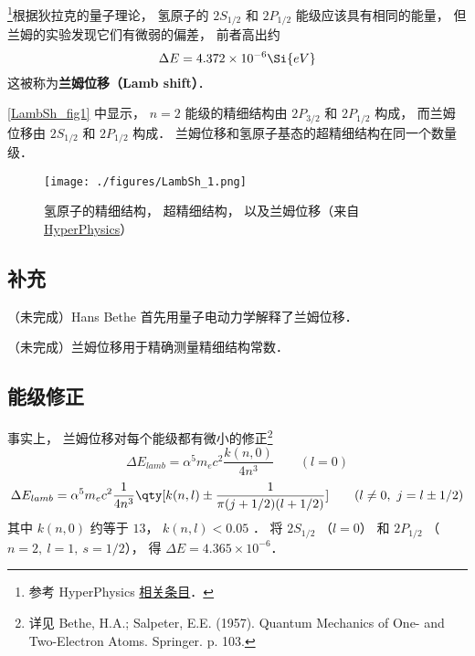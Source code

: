 

\footnote{参考 HyperPhysics \href{http://hyperphysics.phy-astr.gsu.edu/hbase/quantum/lamb.html}{相关条目}．}根据狄拉克的量子理论， 氢原子的 $2S_{1/2}$ 和 $2P_{1/2}$ 能级应该具有相同的能量， 但兰姆的实验发现它们有微弱的偏差， 前者高出约
\begin{equation}
\Delta E = 4.372\times 10^{-6} \Si{eV}
\end{equation}
这被称为\textbf{兰姆位移（Lamb shift）}．

\autoref{LambSh_fig1} 中显示， $n=2$ 能级的精细结构由 $2P_{3/2}$ 和 $2P_{1/2}$ 构成， 而兰姆位移由 $2S_{1/2}$ 和 $2P_{1/2}$ 构成． 兰姆位移和氢原子基态的超精细结构在同一个数量级． 
\begin{figure}[ht]
\centering
\texttt{[image: ./figures/LambSh\_1.png]}
\caption{氢原子的精细结构， 超精细结构， 以及兰姆位移（来自 \href{http://hyperphysics.phy-astr.gsu.edu/hbase/quantum/lamb.html}{HyperPhysics}）} \label{LambSh_fig1}
\end{figure} %

\subsection{补充}
（未完成）Hans Bethe 首先用量子电动力学解释了兰姆位移．

（未完成）兰姆位移用于精确测量精细结构常数．

\subsection{能级修正}
事实上， 兰姆位移对每个能级都有微小的修正\footnote{详见 Bethe, H.A.; Salpeter, E.E. (1957). Quantum Mechanics of One- and Two-Electron Atoms. Springer. p. 103.}
\begin{equation}
\Delta E_{lamb} = \alpha^5 m_e c^2 \frac{k(n, 0)}{4n^3} \qquad (l = 0)
\end{equation}
\begin{equation}
\Delta E_{lamb} =\alpha^5 m_e c^2 \frac{1}{4n^3} \qty[k(n,l) \pm \frac{1}{\pi(j+1/2)(l+1/2)} ] \qquad (l \ne 0,\ j = l \pm 1/2)
\end{equation}
其中 $k(n, 0)$ 约等于 $13$， $k(n, l) < 0.05$ ． 将 $2S_{1/2}$ （$l = 0$） 和 $2P_{1/2}$ （$n = 2,\ l = 1,\ s = 1/2$）， 得 $\Delta E = 4.365\times 10^{-6}$．
